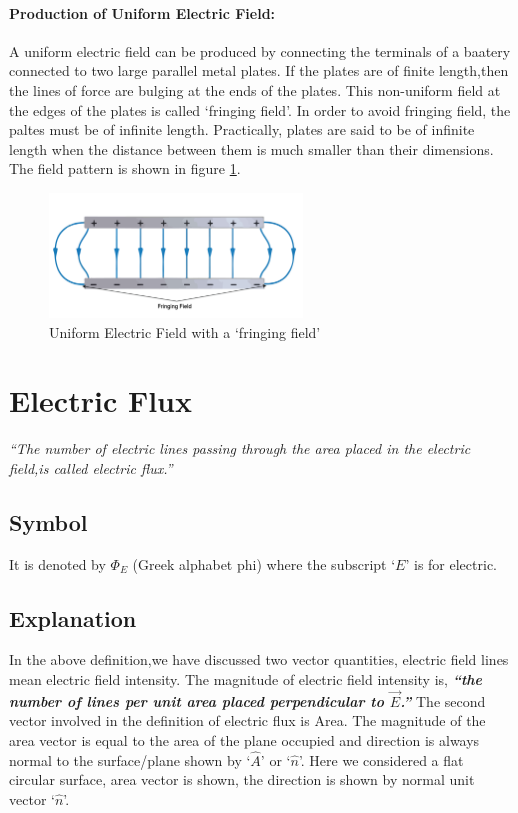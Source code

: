 \paragraph{Production of Uniform Electric Field:}
A uniform electric field can be produced by connecting the
terminals of a baatery connected to two large parallel metal plates.
If the plates are of finite length,then the lines of force are bulging
at the ends of the plates. This non-uniform field at the edges
of the plates is called ‘fringing field’. In order to avoid fringing field,
the paltes must be of infinite length. Practically, plates are said to
be of infinite length when the distance between them is much smaller than
their dimensions. The field pattern is shown in figure \ref{fig:11.8}.

\begin{figure}[H]
  \centering
  \includegraphics[width=0.6\textwidth]{Images/11.8.png}
  \caption{Uniform Electric Field with a `fringing field'}
  \label{fig:11.8}
\end{figure}

\section{Electric Flux}
\textit{“The number of electric lines passing through the area placed in the electric field,is called electric flux.”}
\subsection*{Symbol}
It is denoted by $\Phi_{E}$ (Greek alphabet phi) where the subscript ‘$E$’
is for electric.
\subsection*{Explanation}
In the above definition,we have discussed two vector quantities,
electric field lines mean electric field intensity. The magnitude of
electric field intensity is, \textit{\textbf{“the number of lines per unit area
placed perpendicular to $\vec{E}$.”}} The second vector involved in the
definition of electric flux is Area. The magnitude of the area vector
is equal to the area of the plane occupied and direction is always normal
to the surface/plane shown by `$\hat{A}$' or `$\hat{n}$'.
Here we considered a flat circular surface, area vector is shown,
the direction is shown by normal unit vector `$\hat{n}$'.
